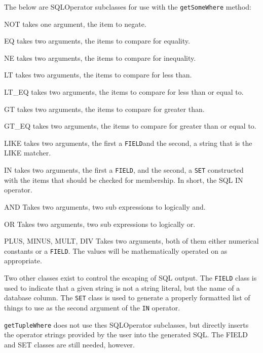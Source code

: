 \documentclass[titlepage]{manual}
\begin{document}
The below are SQLOperator subclasses for use with the \texttt{getSomeWhere} method:
\begin{argdesc}
\item[NOT] takes one argument, the item to negate.
\item[EQ] takes two arguments, the items to compare for equality.
\item[NE]takes two arguments, the items to compare for inequality.
\item[LT ] takes two arguments, the items to compare for less than.
\item[LT_EQ]takes two arguments, the items to compare for less than or
equal to.
\item[GT]takes two arguments, the items to compare for greater than.
\item[GT_EQ]takes two arguments, the items to compare for greater than
or equal to.
\item[LIKE] takes two arguments, the first a \texttt{FIELD}and the second, 
a string that is the LIKE matcher.
\item[IN] takes two arguments, the first a \texttt{FIELD}, and the second,
a \texttt{SET} constructed with the items that should
be checked for membership.  In short, the SQL IN operator.
\item[AND] Takes two arguments, two sub expressions to logically and.
\item[OR] Takes two arguments, two sub expressions to
logically or.
\item[PLUS, MINUS, MULT, DIV] Takes two arguments, both of them either numerical constants
or a \texttt{FIELD}.  The values will be mathematically operated on as appropriate.
\end{argdesc}

Two other classes exist to control the escaping of SQL output. The
\texttt{FIELD} class is used to indicate that a given string is not a
string literal, but the name of a database column.  The \texttt{SET}
class is used to generate a properly formatted list of things to use
as the second argument of the \texttt{IN} operator.

\texttt{getTupleWhere} does not use thes SQLOperator subclasses, but directly
inserts the operator strings provided by the user into the generated
SQL.  The FIELD and SET classes are still needed, however.
\end{document}
